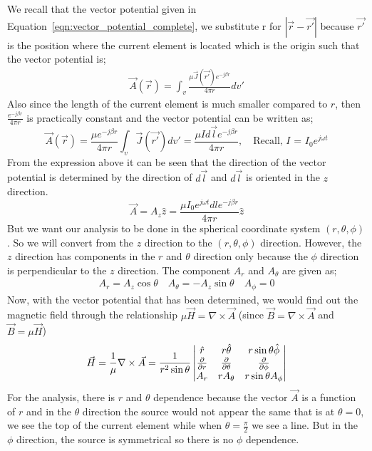 We recall that the vector potential given in Equation~\eqref{eqn:vector_potential_complete}, we substitute r for $|\vec{r} - \vec{r'}|$ because $\vec{r'}$ is the position where the current element is located which is the origin such that the vector potential is;
\begin{align}
\vec{A}(\vec{r}) =\int_v \frac{\mu \vec{J}(\vec{r'}) e^{-j\beta r}}{4\pi r}dv'
\label{eq:vector_potential_lec48}
\end{align} 
Also since the length of the current element is much smaller compared to $r$, then $\frac{e^{-j\beta r}}{4 \pi r}$ is practically constant and the vector potential can be written as;
\begin{dmath*}
\vec{A}(\vec{r}) = \frac{\mu e^{-j\beta r}}{4 \pi r}\int_v\vec{J}(\vec{r'})dv'
= \frac{\mu I d\vec{l} e^{-j\beta r}}{4\pi r},\quad\text{Recall, }I\text{ = }I_0e^{j\omega t}
\end{dmath*}
From the expression above it can be seen that the direction of the vector potential is determined by the direction of $d\vec{l}$ and $d\vec{l}$ is oriented in the $z$ direction. 
\begin{dmath*}
\vec{A} = A_z\hat{z}
= \frac{\mu I_0 e^{j\omega t} dl e^{-j\beta r}}{4\pi r}\hat{z}
\end{dmath*}
But we want our analysis to be done in the spherical coordinate system $(r, \theta, \phi)$. So we will convert from the $z$ direction to the $(r, \theta, \phi)$ direction. However, the $z$ direction has components in the $r$ and $\theta$ direction only because the $\phi$ direction is perpendicular to the $z$ direction. The component $A_{r}$ and $A_{\theta}$ are given as;
\begin{align*}
A_{r} = A_z\cos\theta\quad A_{\theta} = - A_z\sin\theta\quad A_{\phi} = 0
\end{align*}
Now, with the vector potential that has been determined, we would find out the magnetic field through the relationship $\mu \vec{H} = \nabla \times \vec{A}$ (since $\vec{B} = \nabla \times \vec{A}$ and $ \vec{B} = \mu \vec{H}$)
\begin{dmath*}
\vec{H} = \frac{1}{\mu} \nabla \times \vec{A} = \frac{1}{r^2\sin\theta}
\begin{vmatrix}
\hat{r} & r\hat{\theta} & r\sin\theta\hat{\phi} \\
\partialderivative{}{r} &  \partialderivative{}{\theta} &  \partialderivative{}{\phi} \\
A_r & rA_{\theta} & r\sin\theta A_{\phi}
\end{vmatrix}
\end{dmath*}
For the analysis, there is $r$ and $\theta$ dependence because the vector $\vec{A}$ is a function of $r$ and in the $\theta$ direction the source would not appear the same that is at $\theta = 0$, we see the top of the current element while when $\theta = \frac{\pi}{2}$ we see a line. But in the $\phi$ direction, the source is symmetrical so there is no $\phi$ dependence.

